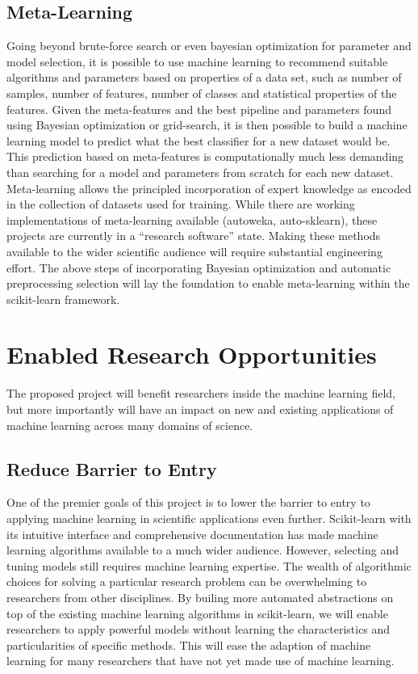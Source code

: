 \subsection{Meta-Learning}
Going beyond brute-force search or even bayesian optimization for parameter and
model selection, it is possible to use machine learning to recommend suitable
algorithms and parameters based on properties of a data set, such as number of
samples, number of features, number of classes and statistical properties of
the features. 
Given the meta-features and the best pipeline and parameters found using
Bayesian optimization or grid-search, it is then possible to build a machine
learning model to predict what the best classifier for a new dataset would be.
This prediction based on meta-features is computationally much less demanding
than searching for a model and parameters from scratch for each new dataset.
Meta-learning allows the principled incorporation of expert knowledge as encoded
in the collection of datasets used for training.
While there are working implementations of meta-learning available (autoweka, auto-sklearn),
these projects are currently in a ``research software'' state. Making these methods
available to the wider scientific audience will require substantial engineering
effort. The above steps of incorporating Bayesian optimization and automatic
preprocessing selection will lay the foundation to enable meta-learning within the
scikit-learn framework.

\section{Enabled Research Opportunities}
The proposed project will benefit researchers inside the machine learning field,
but more importantly will have an impact on new and existing applications of machine
learning across many domains of science.

\subsection{Reduce Barrier to Entry}
One of the premier goals of this project is to lower the barrier to entry
to applying machine learning in scientific applications even further.
Scikit-learn with its intuitive interface and comprehensive documentation
has made machine learning algorithms available to a much wider audience.
However, selecting and tuning models still requires machine learning expertise.
The wealth of algorithmic choices for solving a particular research problem can be
overwhelming to researchers from other disciplines. By builing more automated
abstractions on top of the existing machine learning algorithms in scikit-learn,
we will enable researchers to apply powerful models without learning
the characteristics and particularities of specific methods.
This will ease the adaption of machine learning for many researchers
that have not yet made use of machine learning.

